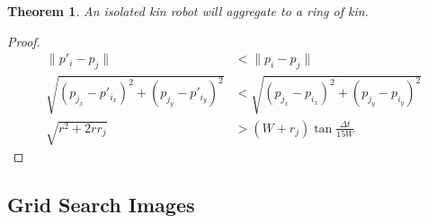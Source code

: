 \documentclass[conference]{IEEEtran}
\newtheorem{theorem}{Theorem}
\begin{document}
  \begin{theorem} \label{thm:aggregation_with_ring_of_kin}
    An isolated kin robot will aggregate to a ring of kin.
  \end{theorem}
  \begin{proof}
    \begin{align*}
      \lVert p'_i - p_j \rVert &< \lVert p_i - p_j \rVert \\
      \sqrt{(p_{j_x} - p'_{i_x})^2 + (p_{j_y} - p'_{i_y})^2} &< \sqrt{(p_{j_x} - p_{i_x})^2 + (p_{j_y} - p_{i_y})^2} \\
      \sqrt{r^2 + 2rr_j} &> (W+r_j)\tan{\frac{\Delta t}{15W}}
    \end{align*}
  \end{proof}

  \pagebreak
  \subsection{Grid Search Images} \label{section:grid_search_images}
\end{document}
